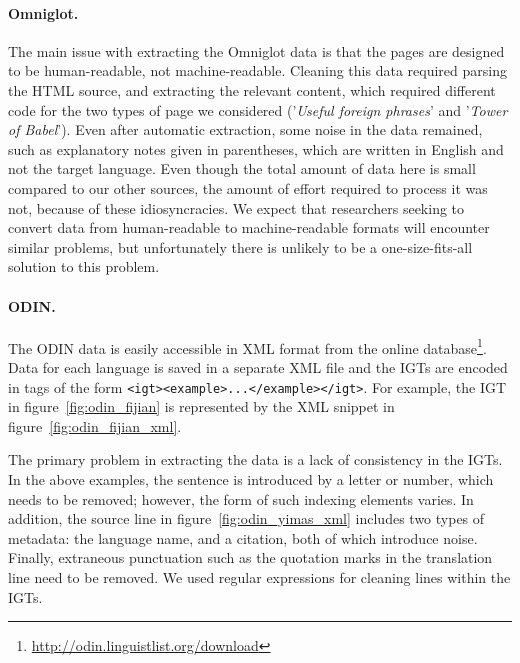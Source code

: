 \paragraph{Omniglot.}
The main issue with extracting the Omniglot data is that the pages are designed to be human-readable, not machine-readable.  Cleaning this data required parsing the HTML source, and extracting the relevant content, which required different code for the two types of page we considered ('\emph{Useful foreign phrases}' and '\emph{Tower of Babel}').  Even after automatic extraction, some noise in the data remained, such as explanatory notes given in parentheses, which are written in English and not the target language.  Even though the total amount of data here is small compared to our other sources, the amount of effort required to process it was not, because of these idiosyncracies.  We expect that researchers seeking to convert data from human-readable to machine-readable formats will encounter similar problems, but unfortunately there is unlikely to be a one-size-fits-all solution to this problem.


\paragraph{ODIN.}
The ODIN data is easily accessible in XML format from the online database\footnote{\url{http://odin.linguistlist.org/download}}. Data for each language is saved in a separate XML file and the IGTs are encoded in tags of the form \texttt{<igt><example>...</example></igt>}.  For example, the IGT in figure~\ref{fig:odin_fijian} is represented by the XML snippet in figure~\ref{fig:odin_fijian_xml}.




The primary problem in extracting the data is a lack of consistency in
the IGTs. In the above examples, the sentence is introduced by a
letter or number, which needs to be removed; however, the form of such
indexing elements varies. In addition, the source line in figure~\ref{fig:odin_yimas_xml}
includes two types of metadata: the language name, and a citation,
both of which introduce noise.  Finally, extraneous punctuation such
as the quotation marks in the translation line need to be removed. We used regular expressions for cleaning lines within the IGTs.


